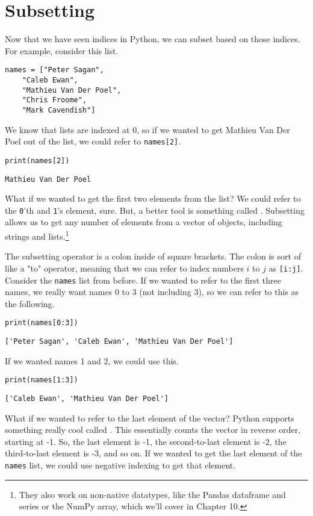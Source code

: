 \section{Subsetting}
Now that we have seen indices in Python, we can subset based on those indices. For example, consider this list.\par
\begin{lstlisting}[style=pippython]
names = ["Peter Sagan",
    "Caleb Ewan",
    "Mathieu Van Der Poel",
    "Chris Froome",
    "Mark Cavendish"]
\end{lstlisting}
We know that lists are indexed at 0, so if we wanted to get Mathieu Van Der Poel out of the list, we could refer to \verb|names[2]|.
\begin{lstlisting}[style=pippython]
print(names[2])
\end{lstlisting}
\begin{lstlisting}[style=none]
Mathieu Van Der Poel
\end{lstlisting}
What if we wanted to get the first two elements from the list? We could refer to the \verb|0|'th and \verb|1|'s element, sure. But, a better tool is something called . Subsetting allows us to get any number of elements from a vector of objects, including strings and lists.\footnote{They also work on non-native datatypes, like the Pandas dataframe and series or the NumPy array, which we'll cover in Chapter 10.}\par
The subsetting operator is a colon inside of square brackets. The colon is sort of like a "to" operator, meaning that we can refer to index numbers $i$ to $j$ as \verb|[i:j]|. Consider the \verb|names| list from before. If we wanted to refer to the first three names, we really want names 0 to 3 (not including 3), so we can refer to this as the following.
\begin{lstlisting}[style=pippython]
print(names[0:3])
\end{lstlisting}
\begin{lstlisting}[style=none]
['Peter Sagan', 'Caleb Ewan', 'Mathieu Van Der Poel']
\end{lstlisting}
If we wanted names 1 and 2, we could use this.
\begin{lstlisting}[style=pippython]
print(names[1:3])
\end{lstlisting}
\begin{lstlisting}[style=none]
['Caleb Ewan', 'Mathieu Van Der Poel']
\end{lstlisting}
What if we wanted to refer to the last element of the vector? Python supports something really cool called . This essentially counts the vector in reverse order, starting at -1. So, the last element is -1, the second-to-last element is -2, the third-to-last element is -3, and so on. If we wanted to get the last element of the \verb|names| list, we could use negative indexing to get that element.
